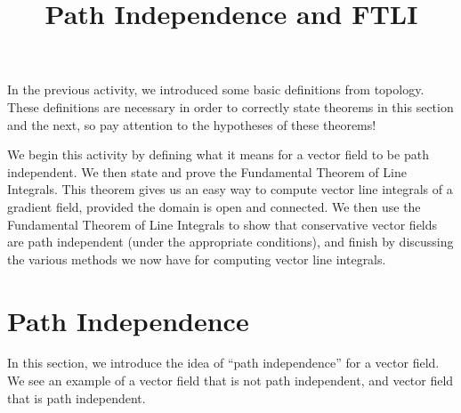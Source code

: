 \documentclass{ximera}
\title{Path Independence and FTLI}
\begin{document}
  
\begin{abstract}  
\end{abstract}  
\maketitle  

In the previous activity, we introduced some basic definitions from topology. These definitions are necessary in order to correctly state theorems in this section and the next, so pay attention to the hypotheses of these theorems!

We begin this activity by defining what it means for a vector field to be path independent. We then state and prove the Fundamental Theorem of Line Integrals. This theorem gives us an easy way to compute vector line integrals of a gradient field, provided the domain is open and connected. We then use the Fundamental Theorem of Line Integrals to show that conservative vector fields are path independent (under the appropriate conditions), and finish by discussing the various methods we now have for computing vector line integrals.

\section{Path Independence}

In this section, we introduce the idea of ``path independence'' for a vector field. We see an example of a vector field that is not path independent, and vector field that is path independent.
\end{document}
